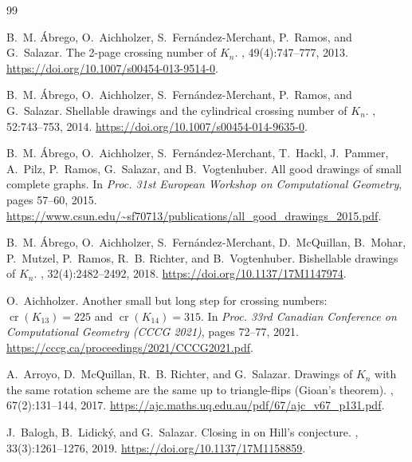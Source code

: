 \documentclass{article}
\theoremstyle{plain}
\theoremstyle{definition}
\theoremstyle{remark}
\begin{document}
\begin{thebibliography}{99}

B.~M. {\'A}brego, O.~Aichholzer, S.~Fern\'andez-Merchant, P.~Ramos,
and G.~Salazar.
\newblock The 2-page crossing number of \(K_n\).
, 49(4):747--777, 2013.
\newblock \url{https://doi.org/10.1007/s00454-013-9514-0}.

B.~M. {\'A}brego, O.~Aichholzer, S.~Fern\'andez-Merchant, P.~Ramos,
and G.~Salazar.
\newblock Shellable drawings and the cylindrical crossing number of
  \(K_n\).
, 52:743--753, 2014.
\newblock \url{https://doi.org/10.1007/s00454-014-9635-0}.

B.~M. {\'A}brego, O.~Aichholzer, S.~Fern\'andez-Merchant, T.~Hackl,
J.~Pammer, A.~Pilz, P.~Ramos, G.~Salazar, and B.~Vogtenhuber.
\newblock All good drawings of small complete graphs.
\newblock In {\em Proc. 31st European Workshop on Computational
  Geometry}, pages 57--60, 2015.
\newblock
\url{https://www.csun.edu/~sf70713/publications/all_good_drawings_2015.pdf}.

B.~M. {\'A}brego, O.~Aichholzer, S.~Fern\'andez-Merchant,
D.~McQuillan, B.~Mohar, P.~Mutzel, P.~Ramos, R.~B. Richter, and
B.~Vogtenhuber.
\newblock Bishellable drawings of \(K_n\).
, 32(4):2482--2492, 2018.
\newblock \url{https://doi.org/10.1137/17M1147974}.

O.~Aichholzer.
\newblock Another small but long step for crossing numbers:
  \(\operatorname{cr}(K_{13})=225\) and
  \(\operatorname{cr}(K_{14})=315\).
\newblock In {\em Proc. 33rd Canadian Conference on Computational
  Geometry (CCCG 2021)}, pages 72--77, 2021.
\newblock \url{https://cccg.ca/proceedings/2021/CCCG2021.pdf}.

A.~Arroyo, D.~McQuillan, R.~B. Richter, and G.~Salazar.
\newblock Drawings of \(K_n\) with the same rotation scheme are the
  same up to triangle-flips (Gioan's theorem).
, 67(2):131--144, 2017.
\newblock
\url{https://ajc.maths.uq.edu.au/pdf/67/ajc_v67_p131.pdf}.

J.~Balogh, B.~Lidick\'y, and G.~Salazar.
\newblock Closing in on Hill's conjecture.
, 33(3):1261--1276, 2019.
\newblock \url{https://doi.org/10.1137/17M1158859}.


\end{thebibliography}
\end{document}
